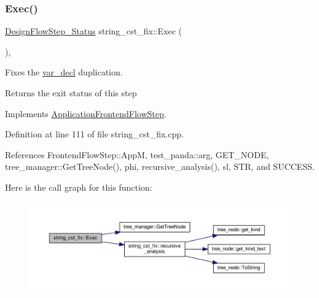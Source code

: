 \mbox{\label{classstring__cst__fix_a366deb5000664520f5b7979a5ecb48bc}} 
\subsubsection{\texorpdfstring{Exec()}{Exec()}}
{\footnotesize\ttfamily \hyperlink{design__flow__step_8hpp_afb1f0d73069c26076b8d31dbc8ebecdf}{Design\+Flow\+Step\+\_\+\+Status} string\+\_\+cst\+\_\+fix\+::\+Exec (\begin{DoxyParamCaption}{ }\end{DoxyParamCaption})\hspace{0.3cm}{\ttfamily [override]}, {\ttfamily [virtual]}}



Fixes the \hyperlink{structvar__decl}{var\+\_\+decl} duplication. 

\begin{DoxyReturn}{Returns}
the exit status of this step 
\end{DoxyReturn}


Implements \hyperlink{classApplicationFrontendFlowStep_a2bf060a5ebc1735635dc5c7773387a25}{Application\+Frontend\+Flow\+Step}.



Definition at line 111 of file string\+\_\+cst\+\_\+fix.\+cpp.



References Frontend\+Flow\+Step\+::\+AppM, test\+\_\+panda\+::arg, G\+E\+T\+\_\+\+N\+O\+DE, tree\+\_\+manager\+::\+Get\+Tree\+Node(), phi, recursive\+\_\+analysis(), sl, S\+TR, and S\+U\+C\+C\+E\+SS.

Here is the call graph for this function\+:
\nopagebreak
\begin{figure}[H]
\begin{center}
\leavevmode
\includegraphics[width=350pt]{d0/daa/classstring__cst__fix_a366deb5000664520f5b7979a5ecb48bc_cgraph}
\end{center}
\end{figure}
\mbox{\label{classstring__cst__fix_a2f68c8aa5c58dc2db4ba9f25a02d3160}} 
